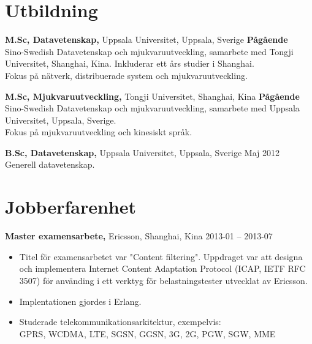 \documentclass[margin]{res}
\begin{document}

\address{{\bf Kontaktinformation}\\

linkedin.com/in/tommymattsson\\
github.com/Taddic\\
}

\address{{\bf Adress}\\
  \\
}

\begin{resume}


\section{Utbildning}
{\bf M.Sc,  Datavetenskap,} Uppsala Universitet, Uppsala, Sverige \hfill \textbf{Pågående} \\
Sino-Swedish Datavetenskap och mjukvaruutveckling, samarbete med Tongji Universitet, Shanghai, Kina. Inkluderar ett års studier i Shanghai. \\
Fokus på nätverk, distribuerade system och mjukvaruutveckling.

{\bf M.Sc, Mjukvaruutveckling,} Tongji Universitet, Shanghai, Kina \hfill \textbf{Pågående} \\
Sino-Swedish Datavetenskap och mjukvaruutveckling, samarbete med Uppsala Universitet, Uppsala, Sverige. \\
Fokus på mjukvaruutveckling och kinesiskt språk.

{\bf B.Sc, Datavetenskap,} Uppsala Universitet, Uppsala, Sverige \hfill Maj 2012 \\
Generell datavetenskap.

\section{Jobberfarenhet}
{\bf Master examensarbete,} Ericsson, Shanghai, Kina \hfill 2013-01 -- 2013-07
 \begin{itemize} \itemsep -2pt  %
 \item Titel för examensarbetet var "Content filtering". Uppdraget var att designa och implementera Internet Content Adaptation Protocol (ICAP, IETF RFC 3507) för använding i ett verktyg för belastningstester utvecklat av Ericsson.
 \item Implentationen gjordes i Erlang.
 \item Studerade telekommunikationsarkitektur, exempelvis: \\
 GPRS, WCDMA, LTE, SGSN, GGSN, 3G, 2G, PGW, SGW, MME
 \end{itemize}


\end{resume}
\end{document}
